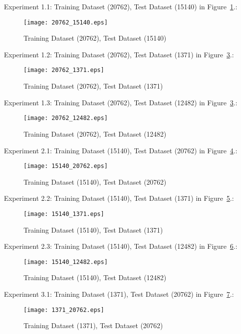 \iffalse
Experiment 1.1: Training Dataset  (20762), Test Dataset  (15140) in Figure~\ref{fig:fig1}.:
\begin{figure}[h]
\centering
\texttt{[image: 20762\_15140.eps]}
\caption{Training Dataset  (20762), Test Dataset  (15140)}
\label{fig:fig1}
\end{figure}

Experiment 1.2: Training Dataset  (20762), Test Dataset  (1371) in Figure~\ref{fig:fig2}.:
\begin{figure}[h]
\centering
\texttt{[image: 20762\_1371.eps]}
\caption{Training Dataset  (20762), Test Dataset  (1371)}
\label{fig:fig2}
\end{figure}

Experiment 1.3: Training Dataset  (20762), Test Dataset  (12482) in Figure~\ref{fig:fig2}.:
\begin{figure}[h]
\centering
\texttt{[image: 20762\_12482.eps]}
\caption{ Training Dataset  (20762), Test Dataset  (12482)}
\label{fig:fig2}
\end{figure}

Experiment 2.1: Training Dataset  (15140), Test Dataset  (20762) in Figure~\ref{fig:fig3}.:
\begin{figure}[h]
\centering
\texttt{[image: 15140\_20762.eps]}
\caption{Training Dataset  (15140), Test Dataset  (20762)}
\label{fig:fig3}
\end{figure}

Experiment 2.2: Training Dataset  (15140), Test Dataset  (1371) in Figure~\ref{fig:fig4}.:
\begin{figure}[h]
\centering
\texttt{[image: 15140\_1371.eps]}
\caption{Training Dataset  (15140), Test Dataset  (1371)}
\label{fig:fig4}
\end{figure}

Experiment 2.3: Training Dataset  (15140), Test Dataset  (12482) in Figure~\ref{fig:fig5}.:
\begin{figure}[h]
\centering
\texttt{[image: 15140\_12482.eps]}
\caption{Training Dataset  (15140), Test Dataset  (12482) }
\label{fig:fig5}
\end{figure}

Experiment 3.1: Training Dataset  (1371), Test Dataset  (20762) in Figure~\ref{fig:fig6}.:
\begin{figure}[h]
\centering
\texttt{[image: 1371\_20762.eps]}
\caption{ Training Dataset  (1371), Test Dataset  (20762)}
\label{fig:fig6}
\end{figure}

